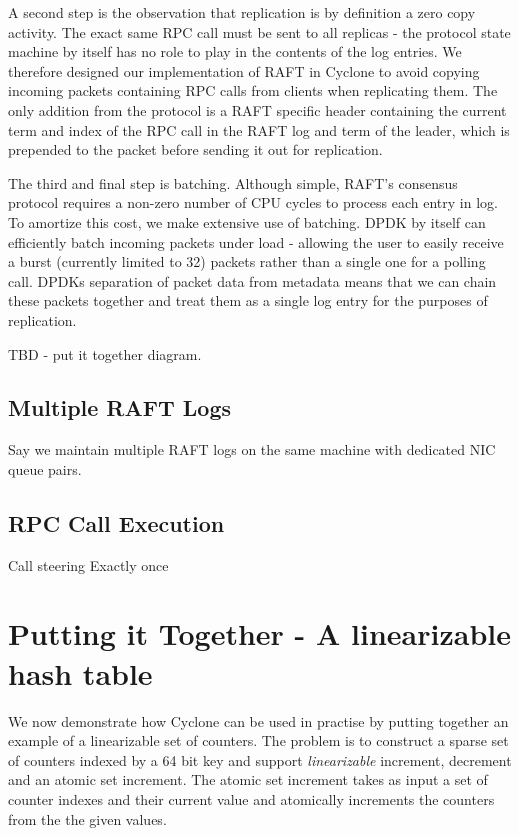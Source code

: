 \documentclass[twocolumn]{article}
\begin{document}
A second step is the observation that replication is by definition a zero copy
activity. The exact same RPC call must be sent to all replicas - the protocol
state machine by itself has no role to play in the contents of the log
entries. We therefore designed our implementation of RAFT in Cyclone to avoid
copying incoming packets containing RPC calls from clients when replicating
them. The only addition from the protocol is a RAFT specific header containing
the current term and index of the RPC call in the RAFT log and term of the
leader, which is prepended to the packet before sending it out for replication.

The third and final step is batching. Although simple, RAFT's consensus protocol
requires a non-zero number of CPU cycles to process each entry in log. To
amortize this cost, we make extensive use of batching. DPDK by itself can
efficiently batch incoming packets under load - allowing the user to easily
receive a burst (currently limited to 32) packets rather than a single one for a
polling call. DPDKs separation of packet data from metadata means that we can
chain these packets together and treat them as a single log entry for the
purposes of replication.

TBD - put it together diagram.

\subsection{Multiple RAFT Logs}
Say we maintain multiple RAFT logs on the same machine with dedicated NIC queue pairs.

\subsection{RPC Call Execution}
Call steering
Exactly once


\section{Putting it Together - A linearizable hash table}
\label{sec:examples}
We now demonstrate how Cyclone can be used in practise by putting together an
example of a linearizable set of counters. The problem is to construct a sparse
set of counters indexed by a 64 bit key and support \emph{linearizable}
increment, decrement and an atomic set increment. The atomic set increment takes
as input a set of counter indexes and their current value and atomically
increments the counters from the the given values. 
\end{document}
